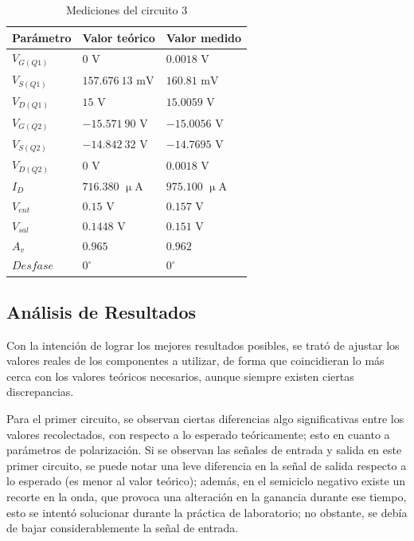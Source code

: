 \documentclass[journal]{IEEEtran}
\begin{document}
\begin{table}[H]
        \renewcommand{\arraystretch}{1.5}
        \caption{Mediciones del circuito 3}
        \centering
        \begin{tabular}{ >{\centering\arraybackslash}m{2.5cm} >{\centering\arraybackslash}m{2.5cm} >{\centering\arraybackslash}m{2.5cm} }
                \hline
            Parámetro & Valor teórico & Valor medido\\ 
            \hline
            $V_{G(Q1)}$ & $0$ $\mathrm{V}$ & $0.0018$ $\mathrm{V}$ \\ 
            $V_{S(Q1)}$ & $157.676~13$ $\mathrm{mV}$ & $160.81$ $\mathrm{mV}$ \\
            $V_{D(Q1)}$ & $15$ $\mathrm{V}$ & $15.0059$ $\mathrm{V}$ \\
            $V_{G(Q2)}$ & $-15.571~90$ $\mathrm{V}$ & $-15.0056$ $\mathrm{V}$ \\ 
            $V_{S(Q2)}$ & $-14.842~32$ $\mathrm{V}$ & $-14.7695$ $\mathrm{V}$ \\ 
            $V_{D(Q2)}$ & $0$ $\mathrm{V}$ & $0.0018$ $\mathrm{V}$ \\ 
            $I_D$ & $716.380$ $\upmu\mathrm{A}$ & $975.100$ $\upmu\mathrm{A}$ \\
            $V_{ent}$ & $0.15$ $\mathrm{V}$ & $0.157$ $\mathrm{V}$ \\ 
            $V_{sal}$ & $0.1448$ $\mathrm{V}$ & $0.151$ $\mathrm{V}$ \\
            $A_v$ & $0.965$ & $0.962$ \\
            $Desfase$ & $0^{\circ}$  & $0^{\circ}$ \\
            \hline
        \end{tabular}
        \label{tabla8}
    \end{table}

\subsection{Análisis de Resultados}
Con la intención de lograr los mejores resultados posibles, se trató de ajustar los 
valores reales de los componentes a utilizar, de forma que coincidieran lo más cerca con
los valores teóricos necesarios, aunque siempre existen ciertas discrepancias.

Para el primer circuito, se observan ciertas diferencias algo significativas entre los valores
recolectados, con respecto a lo esperado teóricamente; esto en cuanto a parámetros de polarización. 
Si se observan las señales de entrada y salida en este primer circuito, se puede notar una leve diferencia
en la señal de salida respecto a lo esperado (es menor al valor teórico); además, en el semiciclo negativo
existe un recorte en la onda, que provoca una alteración en la ganancia durante ese tiempo, esto se intentó 
solucionar durante la práctica de laboratorio; no obstante, se debía de bajar considerablemente la señal de entrada.
\end{document}
